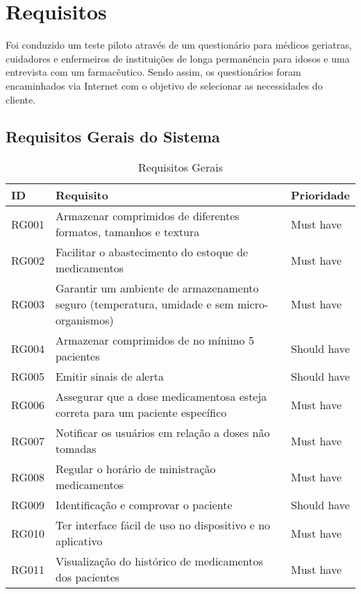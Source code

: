 \chapter[Requisitos]{Requisitos}

Foi conduzido um teste piloto através de um questionário para médicos geriatras, cuidadores e enfermeiros de instituições de longa permanência para idosos e uma entrevista com um farmacêutico. Sendo assim, os questionários foram encaminhados via Internet com o objetivo de selecionar as necessidades do cliente. 

\section{Requisitos Gerais do Sistema}

\begin{table}[H]
    \centering
    \caption{Requisitos Gerais}
    \begin{tabular}{|L{2cm}|L{8cm}|C{2.5cm}|}
        \hline
        \textbf{ID} & \textbf{Requisito} & \textbf{Prioridade} \\
        \hline
        RG001 & Armazenar comprimidos de diferentes formatos, tamanhos e textura & Must have\\ 
        \hline
        RG002 & Facilitar o abastecimento do estoque de medicamentos & Must have \\
        \hline
        RG003 & Garantir um ambiente de armazenamento seguro (temperatura, umidade e sem micro-organismos) & Must have\\ 
        \hline
        RG004 & Armazenar comprimidos de no mínimo 5 pacientes  & Should have\\ 
        \hline
        RG005 & Emitir sinais de alerta & Should have\\ 
        \hline
        RG006 & Assegurar que a dose medicamentosa esteja correta para um paciente específico & Must have\\
        \hline
        RG007 & Notificar os usuários em relação a doses não tomadas & Must have\\
        \hline
        RG008 & Regular o horário de ministração medicamentos & Must have\\ 
        \hline
        RG009 &  Identificação e comprovar o paciente  & Should have\\
        \hline
        RG010 & Ter interface fácil de uso no dispositivo e no aplicativo & Must have\\
        \hline
        RG011 & Visualização do histórico de medicamentos dos pacientes & Must have\\ 
        \hline
    \end{tabular}
\end{table}


